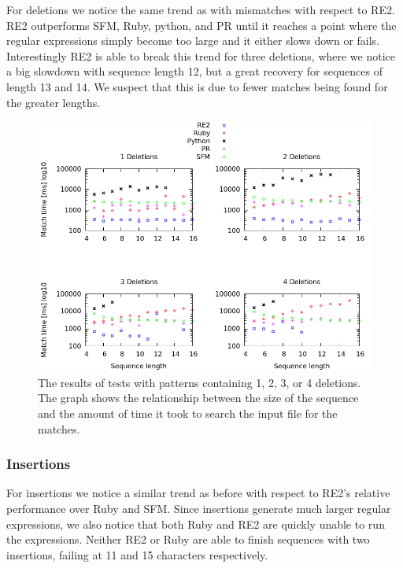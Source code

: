 \documentclass[12pt]{article}
\theoremstyle{definition}
\begin{document}
For deletions we notice the same trend as with mismatches with respect to RE2. RE2 outperforms SFM, Ruby, python, and PR until it reaches a point where the regular expressions simply become too large and it either slows down or fails. Interestingly RE2 is able to break this trend for three deletions, where we notice a big slowdown with sequence length 12, but a great recovery for sequences of length 13 and 14. We suspect that this is due to fewer matches being found for the greater lengths.

\begin{figure}[H]
	\begin{center}
		\includegraphics[scale=0.55]{graphs/deletions.png}	
	\end{center}
	\caption{The results of tests with patterns containing 1, 2, 3, or 4 deletions. The graph shows the relationship between the size of the sequence and the amount of time it took to search the input file for the matches.}
	\label{graph:cases:deletions}
\end{figure}


\subsubsection{Insertions}

For insertions we notice a similar trend as before with respect to RE2's relative performance over Ruby and SFM. Since insertions generate much larger regular expressions, we also notice that both Ruby and RE2 are quickly unable to run the expressions. Neither RE2 or Ruby are able to finish sequences with two insertions, failing at 11 and 15 characters respectively.
\end{document}
